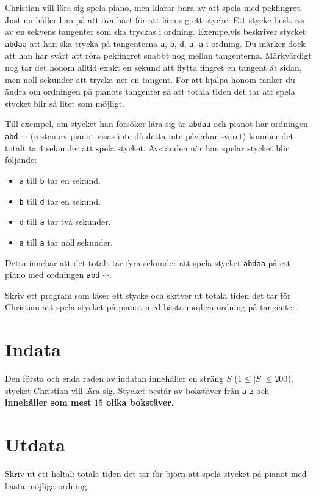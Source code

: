 \noindent

Christian vill lära sig spela piano, men klarar bara av att spela med pekfingret.
Just nu håller han på att öva hårt för att lära sig ett stycke.
Ett stycke beskrivs av en sekvens tangenter som ska tryckas i ordning. Exempelvis beskriver
stycket \texttt{abdaa} att han ska trycka på tangenterna
\texttt{a}, \texttt{b}, \texttt{d}, \texttt{a}, \texttt{a} i ordning. 
Du märker dock att han har svårt att röra pekfingret snabbt nog mellan tangenterna.
Märkvärdigt nog tar det honom alltid exakt en sekund att flytta fingret en tangent åt sidan, men
noll sekunder att trycka ner en tangent.
För att hjälpa honom tänker du ändra om ordningen på pianots tangenter så att totala tiden
det tar att spela stycket blir så litet som möjligt.

Till exempel, om stycket han försöker lära sig är \texttt{abdaa} och pianot har ordningen
\texttt{abd} $\cdots$ (resten av pianot visas inte då detta inte påverkar svaret)
kommer det totalt ta $4$ sekunder att spela stycket.
Avstånden när han spelar stycket blir följande:
\begin{itemize}
  \item \texttt{a} till \texttt{b} tar en sekund.
  \item \texttt{b} till \texttt{d} tar en sekund.
  \item \texttt{d} till \texttt{a} tar två sekunder.
  \item \texttt{a} till \texttt{a} tar noll sekunder.
\end{itemize}
Detta innebär att det totalt tar fyra sekunder att spela stycket \texttt{abdaa} på ett piano
med ordningen \texttt{abd} $\cdots$.

Skriv ett program som läser ett stycke och skriver ut totala tiden det tar för Christian att
spela stycket på pianot med bästa möjliga ordning på tangenter.

\section*{Indata}
Den första och enda raden av indatan innehåller en sträng $S$ ($1 \leq |S| \leq 200$),
stycket Christian vill lära sig. Stycket består av bokstäver från \texttt{a}-\texttt{z}
och \textbf{innehåller som mest $15$ olika bokstäver}. 

\section*{Utdata}
Skriv ut ett heltal: totala tiden det tar för björn att spela stycket på pianot med bästa möjliga ordning.


